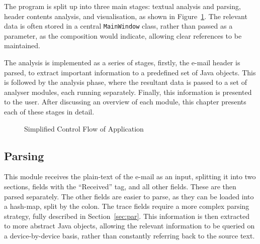 The program is split up into three main stages: textual analysis and parsing,
header contents analysis, and visualisation, as shown in Figure~\ref{fig:con}.
The relevant data is often stored in a central \texttt{MainWindow} class,
rather than passed as a parameter, as the composition would indicate, allowing
clear references to be maintained.

The  analysis is implemented as a series of stages, firstly, the e-mail header
is parsed, to extract important information to a predefined set of Java objects.
This is followed by the analysis phase, where the resultant data is passed to a
set of analyser modules, each running separately.  Finally, this information is
presented to the user.  After discussing an overview of each module, this chapter 
presents each of these stages in detail.

\begin{figure}
	\centering
{}
\caption{Simplified Control Flow of Application}
\label{fig:con}
\end{figure}

\subsection{Parsing}

This module receives the plain-text of the e-mail as an input, splitting it
into two sections, fields with the ``Received'' tag, and all other fields.
These are then parsed separately.  The other fields are easier to parse, as
they can be loaded into a hash-map, split by the colon.  The trace fields
require a more complex parsing strategy, fully described in
Section~\ref{sec:par}.  This information is then extracted to more abstract
Java objects, allowing the relevant information to be queried on a
device-by-device basis, rather than constantly referring back to the source
text.

